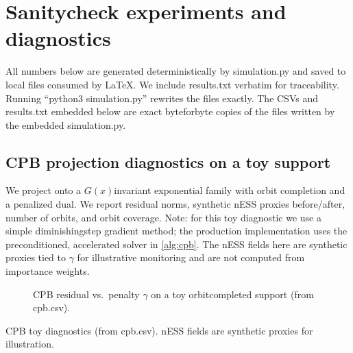\section{Sanity\textendash check experiments and diagnostics}
All numbers below are generated deterministically by simulation.py and saved to local files consumed by LaTeX. We include results.txt verbatim for traceability. Running “python3 simulation.py” rewrites the files exactly. The CSVs and results.txt embedded below are exact byte\textendash for\textendash byte copies of the files written by the embedded simulation.py.

\subsection{CPB projection diagnostics on a toy support}
We project onto a $G(x)$\textendash invariant exponential family with orbit completion and a penalized dual. We report residual norms, synthetic nESS proxies before/after, number of orbits, and orbit coverage. Note: for this toy diagnostic we use a simple diminishing\textendash step gradient method; the production implementation uses the preconditioned, accelerated solver in \cref{alg:cpb}. The nESS fields here are synthetic proxies tied to $\gamma$ for illustrative monitoring and are not computed from importance weights.

\begin{figure}[t]
\centering
\begin{adjustbox}{width=\linewidth}
\end{adjustbox}
\caption{CPB residual vs.\ penalty $\gamma$ on a toy orbit\textendash completed support (from cpb.csv).}
\label{fig:cpb}
\end{figure}

\begin{table}[t]
\centering
\begin{adjustbox}{width=\linewidth}
\end{adjustbox}
\caption{CPB toy diagnostics (from cpb.csv). nESS fields are synthetic proxies for illustration.}
\label{tab:cpb}
\end{table}


